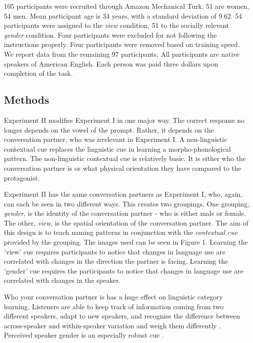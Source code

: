 \documentclass{frontiersSCNS} %
\begin{document}
105 participants were recruited through Amazon Mechanical Turk. 51 are women, 54 men. Mean participant age is 34 years, with a standard deviation of 9.62. 54 participants were assigned to the \emph{view} condition, 51 to the socially relevant \emph{gender} condition. Four participants were excluded for not following the instructions properly. Four participants were removed based on training speed. We report data from the remaining 97 participants. All participants are native speakers of American English. Each person was paid three dollars upon completion of the task.

\subsection{Methods \label{exp2methods}}

Experiment II modifies Experiment I in one major way. The correct response no longer depends on the vowel of the prompt. Rather, it depends on the conversation partner, who was irrelevant in Experiment I. A non-linguistic contextual cue replaces the linguistic cue in learning a morpho-phonological pattern. The non-linguistic contextual cue is relatively basic. It is either who the conversation partner is or what physical orientation they have compared to the protagonist.

Experiment II has the same conversation partners as Experiment I, who, again, can each be seen in two different ways. This creates two groupings. One grouping, \emph{gender}, is the identity of the conversation partner - who is either male or female. The other, \emph{view}, is the spatial orientation of the conversation partner. The aim of this design is to teach naming patterns in conjunction with the \emph{contextual cue} provided by the grouping.  The images used can be seen in Figure 1.
 Learning the 'view' cue requires participants to notice that changes in language use are correlated with changes in the direction the partner is facing.
 Learning the 'gender' cue requires the 
 participants to notice that changes in language use are correlated with changes in the speaker.

Who your conversation partner is has a huge effect on linguistic category learning. Listeners are able to keep track of information coming from two different speakers, adapt to new speakers, and recognise the difference between across-speaker and within-speaker variation and weigh them differently \citep{kraljic2008accommodating,horton2005impact,horton2002speakers}. Perceived speaker gender is an especially robust cue \citep{johnson1999auditory}. 
\end{document}
